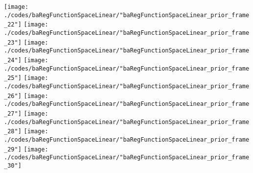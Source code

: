 \begin{frame}{\insertsection}
\begin{center}
{\begin{animateinline}{20}
				 \texttt{[image: ./codes/baRegFunctionSpaceLinear/"baRegFunctionSpaceLinear\_prior\_frame\_22"]}\newframe
				 \texttt{[image: ./codes/baRegFunctionSpaceLinear/"baRegFunctionSpaceLinear\_prior\_frame\_23"]}\newframe
				 \texttt{[image: ./codes/baRegFunctionSpaceLinear/"baRegFunctionSpaceLinear\_prior\_frame\_24"]}\newframe
				 \texttt{[image: ./codes/baRegFunctionSpaceLinear/"baRegFunctionSpaceLinear\_prior\_frame\_25"]}\newframe
				 \texttt{[image: ./codes/baRegFunctionSpaceLinear/"baRegFunctionSpaceLinear\_prior\_frame\_26"]}\newframe
				 \texttt{[image: ./codes/baRegFunctionSpaceLinear/"baRegFunctionSpaceLinear\_prior\_frame\_27"]}\newframe
				 \texttt{[image: ./codes/baRegFunctionSpaceLinear/"baRegFunctionSpaceLinear\_prior\_frame\_28"]}\newframe
				 \texttt{[image: ./codes/baRegFunctionSpaceLinear/"baRegFunctionSpaceLinear\_prior\_frame\_29"]}\newframe
				 \texttt{[image: ./codes/baRegFunctionSpaceLinear/"baRegFunctionSpaceLinear\_prior\_frame\_30"]}
			 \end{animateinline}
			}
	\end{center}
    
\end{frame}

